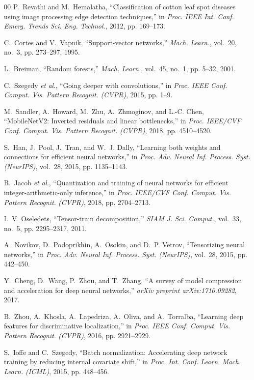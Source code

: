 \documentclass[journal]{IEEEtran}
\begin{document}
\begin{thebibliography}{00}
P.~Revathi and M.~Hemalatha, ``Classification of cotton leaf spot diseases using image processing edge detection techniques,'' in \textit{Proc. IEEE Int. Conf. Emerg. Trends Sci. Eng. Technol.}, 2012, pp. 169--173.

C.~Cortes and V.~Vapnik, ``Support-vector networks,'' \textit{Mach. Learn.}, vol.~20, no.~3, pp. 273--297, 1995.

L.~Breiman, ``Random forests,'' \textit{Mach. Learn.}, vol.~45, no.~1, pp. 5--32, 2001.

C.~Szegedy \textit{et al.}, ``Going deeper with convolutions,'' in \textit{Proc. IEEE Conf. Comput. Vis. Pattern Recognit. (CVPR)}, 2015, pp. 1--9.

M.~Sandler, A.~Howard, M.~Zhu, A.~Zhmoginov, and L.-C. Chen, ``MobileNetV2: Inverted residuals and linear bottlenecks,'' in \textit{Proc. IEEE/CVF Conf. Comput. Vis. Pattern Recognit. (CVPR)}, 2018, pp. 4510--4520.

S.~Han, J.~Pool, J.~Tran, and W.~J. Dally, ``Learning both weights and connections for efficient neural networks,'' in \textit{Proc. Adv. Neural Inf. Process. Syst. (NeurIPS)}, vol.~28, 2015, pp. 1135--1143.

B.~Jacob \textit{et al.}, ``Quantization and training of neural networks for efficient integer-arithmetic-only inference,'' in \textit{Proc. IEEE/CVF Conf. Comput. Vis. Pattern Recognit. (CVPR)}, 2018, pp. 2704--2713.

I.~V. Oseledets, ``Tensor-train decomposition,'' \textit{SIAM J. Sci. Comput.}, vol.~33, no.~5, pp. 2295--2317, 2011.

A.~Novikov, D.~Podoprikhin, A.~Osokin, and D.~P. Vetrov, ``Tensorizing neural networks,'' in \textit{Proc. Adv. Neural Inf. Process. Syst. (NeurIPS)}, vol.~28, 2015, pp. 442--450.

Y.~Cheng, D.~Wang, P.~Zhou, and T.~Zhang, ``A survey of model compression and acceleration for deep neural networks,'' \textit{arXiv preprint arXiv:1710.09282}, 2017.

B.~Zhou, A.~Khosla, A.~Lapedriza, A.~Oliva, and A.~Torralba, ``Learning deep features for discriminative localization,'' in \textit{Proc. IEEE Conf. Comput. Vis. Pattern Recognit. (CVPR)}, 2016, pp. 2921--2929.

S.~Ioffe and C.~Szegedy, ``Batch normalization: Accelerating deep network training by reducing internal covariate shift,'' in \textit{Proc. Int. Conf. Learn. Mach. Learn. (ICML)}, 2015, pp. 448--456.


\end{thebibliography}
\end{document}
